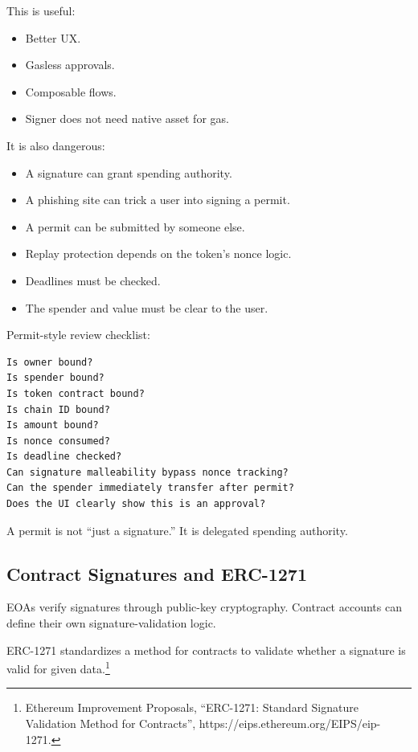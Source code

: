 This is useful:

\begin{itemize}
\tightlist
\item
  Better UX.
\item
  Gasless approvals.
\item
  Composable flows.
\item
  Signer does not need native asset for gas.
\end{itemize}

It is also dangerous:

\begin{itemize}
\tightlist
\item
  A signature can grant spending authority.
\item
  A phishing site can trick a user into signing a permit.
\item
  A permit can be submitted by someone else.
\item
  Replay protection depends on the token's nonce logic.
\item
  Deadlines must be checked.
\item
  The spender and value must be clear to the user.
\end{itemize}

Permit-style review checklist:

\begin{lstlisting}
Is owner bound?
Is spender bound?
Is token contract bound?
Is chain ID bound?
Is amount bound?
Is nonce consumed?
Is deadline checked?
Can signature malleability bypass nonce tracking?
Can the spender immediately transfer after permit?
Does the UI clearly show this is an approval?
\end{lstlisting}

A permit is not ``just a signature.'' It is delegated spending
authority.

\subsection{Contract Signatures and ERC-1271}

EOAs verify signatures through public-key cryptography. Contract
accounts can define their own signature-validation logic.

ERC-1271 standardizes a method for contracts to validate whether a
signature is valid for given data.\footnote{Ethereum Improvement
  Proposals, ``ERC-1271: Standard Signature Validation Method for
  Contracts'', https://eips.ethereum.org/EIPS/eip-1271.}

